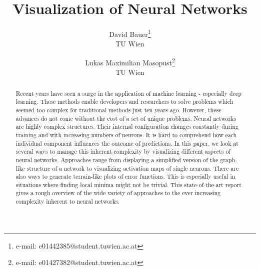 \documentclass{acmsiggraph}               %
\title{Visualization of Neural Networks}
\author{David Bauer\thanks{e-mail: e01442385@student.tuwien.ac.at}\\ TU Wien %
\and Lukas Maximilian Masopust\thanks{e-mail: e01427382@student.tuwien.ac.at}\\ TU Wien %
}
\begin{document}




\maketitle



\begin{abstract}
Recent years have seen a surge in the application of machine learning - especially deep learning. These methods enable developers and researchers to solve problems which seemed too complex for traditional methods just ten years ago. However, these advances do not come without the cost of a set of unique problems. Neural networks are highly complex structures. Their internal configuration changes constantly during training and with increasing numbers of neurons. It is hard to comprehend how each individual component influences the outcome of predictions.
In this paper, we look at several ways to manage this inherent complexity by visualizing different aspects of neural networks. Approaches range from displaying a simplified version of the graph-like structure of a network to visualizing activation maps of single neurons. There are also ways to generate terrain-like plots of error functions. This is especially useful in situations where finding local minima might not be trivial.
This state-of-the-art report gives a rough overview of the wide variety of approaches to the ever increasing complexity inherent to neural networks.
\end{abstract}
\end{document}
